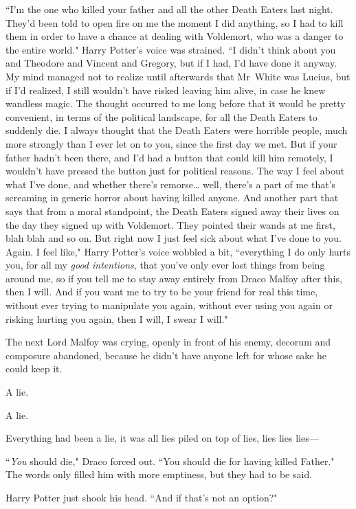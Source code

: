 ``I'm the one who killed your father and all the other Death Eaters last night. They'd been told to open fire on me the moment I did anything, so I had to kill them in order to have a chance at dealing with Voldemort, who was a danger to the entire world." Harry Potter's voice was strained. ``I didn't think about you and Theodore and Vincent and Gregory, but if I had, I'd have done it anyway. My mind managed not to realize until afterwards that Mr~White was Lucius, but if I'd realized, I still wouldn't have risked leaving him alive, in case he knew wandless magic. The thought occurred to me long before that it would be pretty convenient, in terms of the political landscape, for all the Death Eaters to suddenly die. I always thought that the Death Eaters were horrible people, much more strongly than I ever let on to you, since the first day we met. But if your father hadn't been there, and I'd had a button that could kill him remotely, I wouldn't have pressed the button just for political reasons. The way I feel about what I've done, and whether there's remorse{\ldots} well, there's a part of me that's screaming in generic horror about having killed anyone. And another part that says that from a moral standpoint, the Death Eaters signed away their lives on the day they signed up with Voldemort. They pointed their wands at me first, blah blah and so on. But right now I just feel sick about what I've done to you. Again. I feel like," Harry Potter's voice wobbled a bit, ``everything I do only hurts you, for all my \emph{good intentions}, that you've only ever lost things from being around me, so if you tell me to stay away entirely from Draco Malfoy after this, then I will. And if you want me to try to be your friend for real this time, without ever trying to manipulate you again, without ever using you again or risking hurting you again, then I will, I swear I will."

The next Lord Malfoy was crying, openly in front of his enemy, decorum and composure abandoned, because he didn't have anyone left for whose sake he could keep it.

A lie.

A lie.

Everything had been a lie, it was all lies piled on top of lies, lies lies lies—

``\emph{You} should die," Draco forced out. ``You should die for having killed Father." The words only filled him with more emptiness, but they had to be said.

Harry Potter just shook his head. ``And if that's not an option?"

